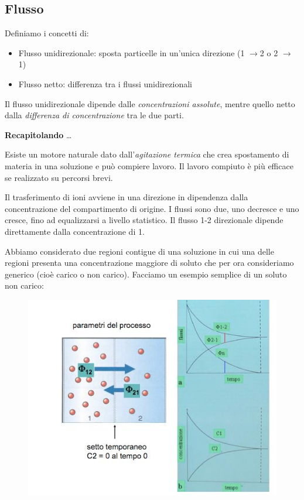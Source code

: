 \documentclass[a4paper,12pt]{article}
\newcommand{\lfreccia}{\ensuremath{\longrightarrow}}
\begin{document}
\subsection{Flusso}
Definiamo i concetti di:
\begin{itemize}
\item{Flusso unidirezionale: sposta particelle in un'unica direzione (1 \lfreccia 2 o 2 \lfreccia 1)}
\item{Flusso netto: differenza tra i flussi unidirezionali}
\end{itemize}

Il flusso unidirezionale dipende dalle \emph{concentrazioni assolute}, mentre quello netto dalla \emph{differenza di concentrazione} tra le due parti.

\textbf{Recapitolando} \ldots

Esiste un motore naturale dato dall'\emph{agitazione termica} che crea spostamento di materia in una soluzione e può compiere lavoro. Il lavoro compiuto è più efficace se realizzato su percorsi brevi.

Il trasferimento di ioni avviene in una direzione in dipendenza dalla concentrazione del compartimento di origine.
I flussi sono due, uno decresce e uno cresce, fino ad equalizzarsi a livello statistico. Il flusso 1-2 direzionale dipende direttamente dalla concentrazione di 1.

Abbiamo considerato due regioni contigue di una soluzione in cui una delle regioni presenta una concentrazione maggiore di soluto che per ora consideriamo generico (cioè carico o non carico). Facciamo un esempio semplice di un soluto non carico:
\begin{figure}[H]
\centering
\includegraphics[scale=0.5]{immagine/potenziale.jpg}
\caption{}
\end{figure}
\end{document}
